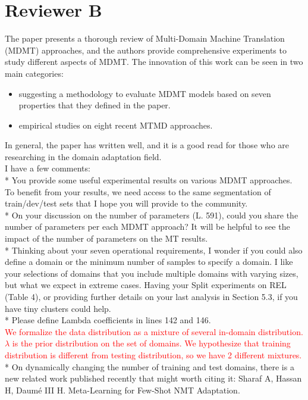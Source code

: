 \documentclass[12pt,times,a4paper,twoside]{article}
\newcommand{\fyTodo}[1]{\Todo[FY:]{\textcolor{orange}{#1}}}
\theoremstyle{definition}
\begin{document}
\section*{Reviewer B}
The paper presents a thorough review of Multi-Domain Machine Translation (MDMT) approaches, and the authors provide comprehensive experiments to study different aspects of MDMT. The innovation of this work can be seen in two main categories:
\begin{itemize}
	\item suggesting a methodology to evaluate MDMT models based on seven properties that they defined in the paper.
	\item empirical studies on eight recent MTMD approaches.
\end{itemize}
In general, the paper has written well, and it is a good read for those who are researching in the domain adaptation field. 
\\
I have a few comments:
\\
* You provide some useful experimental results on various MDMT approaches. To benefit from your results, we need access to the same segmentation of train/dev/test sets that I hope you will provide to the community.
\fyTodo{to share data}
\\
* On your discussion on the number of parameters (L. 591), could you share the number of parameters per each MDMT approach? It will be helpful to see  the impact of the number of parameters on the MT results. 
\fyTodo{system's description}
\\
* Thinking about your seven operational requirements, I wonder if you could also define a domain or the minimum number of samples to specify a domain. I like your selections of domains that you include multiple domains with varying sizes, but what we expect in extreme cases. Having your Split experiments on REL (Table 4), or providing further details on your last analysis in Section 5.3, if you have tiny clusters could help.
\\
* Please define Lambda coefficients in lines 142 and 146.
\\
\textcolor{red}{We formalize the data distribution as a mixture of several in-domain distribution. $\lambda$ is the prior distribution on the set of domains. We hypothesize that training distribution is different from testing distribution, so we have 2 different mixtures.}
\\
* On dynamically changing the number of training and test domains, there is a new related work published recently that might worth citing it: Sharaf A, Hassan H, Daumé III H. Meta-Learning for Few-Shot NMT Adaptation.
\end{document}
